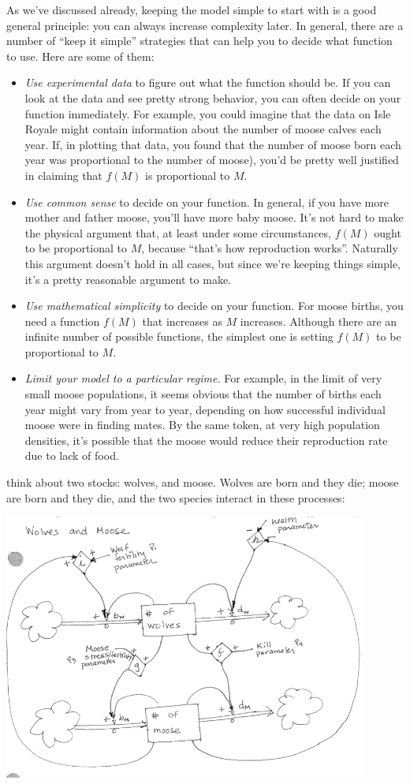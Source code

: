As we've discussed already, keeping the model simple to start with is a good general principle: you can always increase complexity later.  In general, there are a number of ``keep it simple'' strategies that can help you to decide what function to use.  Here are some of them:
\begin{itemize}
\item {\em Use experimental data} to figure out what the function should be.  If you can look at the data and see pretty strong behavior, you can often decide on your function immediately.  For example, you could imagine that the data on Isle Royale might contain information about the number of moose calves each year.  If, in plotting that data, you found that  the number of moose born each year was proportional to the number of moose), you'd be pretty well justified in claiming that $f(M)$ is proportional to $M$.
\item {\em Use common sense} to decide on your function.  In general, if you have more mother and father moose, you'll have more baby moose.  It's not hard to make the physical argument that, at least under some circumstances, $f(M)$ ought to be proportional to $M$, because ``that's how reproduction works''.   Naturally this argument doesn't hold in all cases, but since we're keeping things simple, it's a pretty reasonable argument to make.
\item {\em Use mathematical simplicity} to decide on your function.  For moose births, you need a function $f(M)$ that increases as $M$ increases.  Although there are an infinite number of possible functions, the simplest one is setting $f(M)$ to be proportional to $M$.
\item {\em Limit your model to a particular regime.}  For example, in the limit of very small moose populations, it seems obvious that the number of births each year might vary from year to year, depending on how successful individual moose were in finding mates.  By the same token, at very high population densities, it's possible that the moose would reduce their reproduction rate due to lack of food.  


\end{itemize}
think about two stocks:  wolves, and moose.  Wolves are born and they die; moose are born and they die, and the two species interact in these processes:

\includegraphics[width=12cm]{figs/WolfMooseStockAndFlow}

